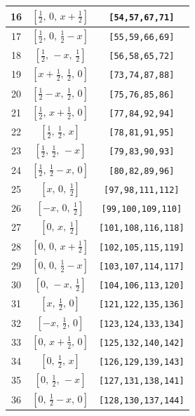\documentclass[fleqn,8pt]{jsarticle}
\begin{document}
\begin{longtable}{ccc}
16 & $\left[ \frac{1}{2},\, 0,\, x + \frac{1}{2} \right]$ & {\tt [54,57,67,71]} \\ \hline
17 & $\left[ \frac{1}{2},\, 0,\, \frac{1}{2} - x \right]$ & {\tt [55,59,66,69]} \\ \hline
18 & $\left[ \frac{1}{2},\, - x,\, \frac{1}{2} \right]$ & {\tt [56,58,65,72]} \\ \hline
19 & $\left[ x + \frac{1}{2},\, \frac{1}{2},\, 0 \right]$ & {\tt [73,74,87,88]} \\ \hline
20 & $\left[ \frac{1}{2} - x,\, \frac{1}{2},\, 0 \right]$ & {\tt [75,76,85,86]} \\ \hline
21 & $\left[ \frac{1}{2},\, x + \frac{1}{2},\, 0 \right]$ & {\tt [77,84,92,94]} \\ \hline
22 & $\left[ \frac{1}{2},\, \frac{1}{2},\, x \right]$ & {\tt [78,81,91,95]} \\ \hline
23 & $\left[ \frac{1}{2},\, \frac{1}{2},\, - x \right]$ & {\tt [79,83,90,93]} \\ \hline
24 & $\left[ \frac{1}{2},\, \frac{1}{2} - x,\, 0 \right]$ & {\tt [80,82,89,96]} \\ \hline
25 & $\left[ x,\, 0,\, \frac{1}{2} \right]$ & {\tt [97,98,111,112]} \\ \hline
26 & $\left[ - x,\, 0,\, \frac{1}{2} \right]$ & {\tt [99,100,109,110]} \\ \hline
27 & $\left[ 0,\, x,\, \frac{1}{2} \right]$ & {\tt [101,108,116,118]} \\ \hline
28 & $\left[ 0,\, 0,\, x + \frac{1}{2} \right]$ & {\tt [102,105,115,119]} \\ \hline
29 & $\left[ 0,\, 0,\, \frac{1}{2} - x \right]$ & {\tt [103,107,114,117]} \\ \hline
30 & $\left[ 0,\, - x,\, \frac{1}{2} \right]$ & {\tt [104,106,113,120]} \\ \hline
31 & $\left[ x,\, \frac{1}{2},\, 0 \right]$ & {\tt [121,122,135,136]} \\ \hline
32 & $\left[ - x,\, \frac{1}{2},\, 0 \right]$ & {\tt [123,124,133,134]} \\ \hline
33 & $\left[ 0,\, x + \frac{1}{2},\, 0 \right]$ & {\tt [125,132,140,142]} \\ \hline
34 & $\left[ 0,\, \frac{1}{2},\, x \right]$ & {\tt [126,129,139,143]} \\ \hline
35 & $\left[ 0,\, \frac{1}{2},\, - x \right]$ & {\tt [127,131,138,141]} \\ \hline
36 & $\left[ 0,\, \frac{1}{2} - x,\, 0 \right]$ & {\tt [128,130,137,144]} \\ \hline

\end{longtable}
\end{document}
